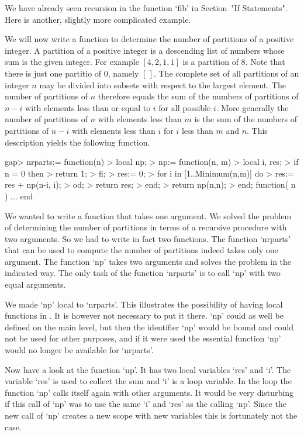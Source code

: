 
We have already seen recursion in the function `fib'
in Section~"If Statements".
Here is another, slightly more complicated example.

We will now write a function to determine  the number of partitions of
a positive integer.  A partition of a positive integer is a descending
list  of numbers   whose sum   is the   given   integer.  For  example
$[4,2,1,1]$ is a partition of 8.  Note that there is just one partitio
of 0, namely $[\,]$. The complete set of all  partitions of an integer
$n$ may be divided  into subsets with respect  to the largest element.
The number  of  partitions of   $n$ therefore  equals  the  sum of the
numbers of partitions of $n-i$ with elements less than or equal to $i$
for all possible $i$.  More generally the  number of partitions of $n$
with elements less than $m$ is the sum of the numbers of partitions of
$n-i$ with elements less than $i$ for $i$ less than $m$ and $n$.  This
description yields the following function.

\beginexample
gap> nrparts:= function(n)
>    local np;
>    np:= function(n, m)
>       local i, res;
>       if n = 0 then
>          return 1;
>       fi;
>       res:= 0;
>       for i in [1..Minimum(n,m)] do
>          res:= res + np(n-i, i);
>       od;
>       return res;
>    end;
>    return np(n,n);
> end;
function( n ) ... end
\endexample

We wanted to  write a function that  takes one argument.   We solved  the
problem of determining the number  of partitions in  terms of a recursive
procedure with two arguments.  So we had to write  in fact two functions.
The  function  `nrparts' that  can  be  used  to  compute the  number  of
partitions indeed takes only one  argument.  The  function `np' takes two
arguments and solves the problem in the indicated way.  The  only task of
the function `nrparts' is to call `np' with two equal arguments.

We made `np' local to `nrparts'.  This  illustrates the possibility of
having local functions in {\GAP}.  It is  however not necessary to put
it there.  `np' could as well  be defined on  the main level, but then
the  identifier `np' would  be bound and could   not be used for other
purposes, and if  it were used  the  essential function `np' would  no
longer be available for `nrparts'.

Now have a look at the function `np'. It has two local variables `res'
and `i'. The  variable `res' is  used to collect the sum  and `i' is a
loop  variable. In the loop the  function `np' calls itself again with
other arguments. It would be very disturbing if this call of `np' was
to use the same `i' and `res' as the calling `np'.  Since the new call
of `np' creates a new scope with new variables this is fortunately not
the case.

